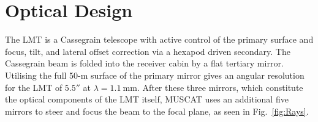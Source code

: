 \documentclass{spie}
\begin{document}
\section{Optical Design}
The LMT is a Cassegrain telescope with active control of the primary surface and focus, tilt, and lateral offset correction via a hexapod driven secondary. The Cassegrain beam is folded into the receiver cabin by a flat tertiary mirror. Utilising the full 50-m surface of the primary mirror gives an angular resolution for the LMT of $5.5\si{\arcsecond}$ at $\lambda = 1.1~\si{\milli\metre}$. After these three mirrors, which constitute the optical components of the LMT itself, MUSCAT uses an additional five mirrors to steer and focus the beam to the focal plane, as seen in Fig.~\ref{fig:Rays}.
\begin{figure}[b]
\centering
{}
\end{figure}
\end{document}
